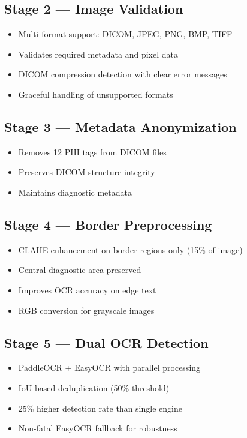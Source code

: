 \documentclass[12pt,a4paper]{article}
\begin{document}
\subsection*{Stage 2 — Image Validation}
\begin{itemize}[leftmargin=1.2cm]
    \item Multi-format support: DICOM, JPEG, PNG, BMP, TIFF
    \item Validates required metadata and pixel data
    \item DICOM compression detection with clear error messages
    \item Graceful handling of unsupported formats
\end{itemize}

\subsection*{Stage 3 — Metadata Anonymization}
\begin{itemize}[leftmargin=1.2cm]
    \item Removes 12 PHI tags from DICOM files
    \item Preserves DICOM structure integrity
    \item Maintains diagnostic metadata
\end{itemize}

\subsection*{Stage 4 — Border Preprocessing}
\begin{itemize}[leftmargin=1.2cm]
    \item CLAHE enhancement on border regions only (15\% of image)
    \item Central diagnostic area preserved
    \item Improves OCR accuracy on edge text
    \item RGB conversion for grayscale images
\end{itemize}

\subsection*{Stage 5 — Dual OCR Detection}
\begin{itemize}[leftmargin=1.2cm]
    \item PaddleOCR + EasyOCR with parallel processing
    \item IoU-based deduplication (50\% threshold)
    \item 25\% higher detection rate than single engine
    \item Non-fatal EasyOCR fallback for robustness
\end{itemize}
\end{document}
